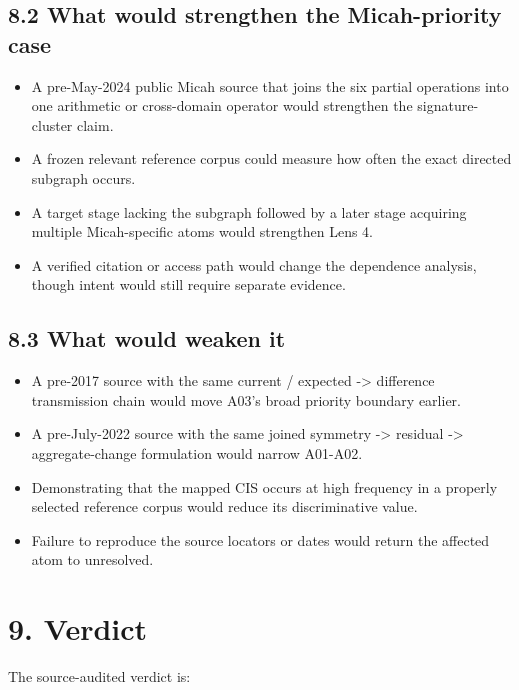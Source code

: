 \documentclass[
  american,
  11pt,
  letterpaper,
]{article}
\providecommand{\tightlist}{%
  \setlength{\itemsep}{0pt}\setlength{\parskip}{0pt}}
\begin{document}
\subsection{8.2 What would strengthen the Micah-priority case}\label{what-would-strengthen-the-micah-priority-case}

\begin{itemize}
\tightlist
\item
  A pre-May-2024 public Micah source that joins the six partial operations into one arithmetic or cross-domain operator would strengthen the signature-cluster claim.
\item
  A frozen relevant reference corpus could measure how often the exact directed subgraph occurs.
\item
  A target stage lacking the subgraph followed by a later stage acquiring multiple Micah-specific atoms would strengthen Lens 4.
\item
  A verified citation or access path would change the dependence analysis, though intent would still require separate evidence.
\end{itemize}

\subsection{8.3 What would weaken it}\label{what-would-weaken-it}

\begin{itemize}
\tightlist
\item
  A pre-2017 source with the same current / expected -\textgreater{} difference transmission chain would move A03's broad priority boundary earlier.
\item
  A pre-July-2022 source with the same joined symmetry -\textgreater{} residual -\textgreater{} aggregate-change formulation would narrow A01-A02.
\item
  Demonstrating that the mapped CIS occurs at high frequency in a properly selected reference corpus would reduce its discriminative value.
\item
  Failure to reproduce the source locators or dates would return the affected atom to unresolved.
\end{itemize}

\section{9. Verdict}\label{verdict}

The source-audited verdict is:
\end{document}
